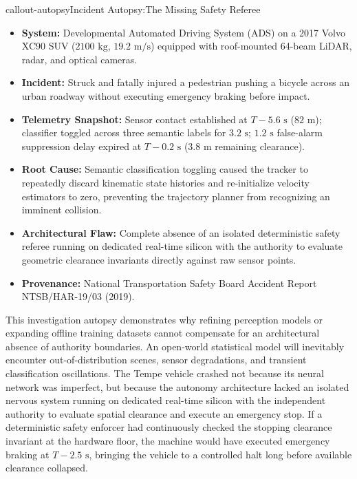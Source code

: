 \documentclass[
  10pt,
  letterpaper,
  twoside,
  openright,
  numbers=noenddot,
  headings=standardclasses
]{scrbook}
\begin{document}
\protect{}\label{callout-autopsyux2a-1.5}
\begin{fbxSimple}{callout-autopsy}{Incident Autopsy:}{The Missing Safety Referee}
\label{callout-autopsy*-1.5}

\begin{itemize}
\tightlist
\item
  \textbf{System:} Developmental Automated Driving System (ADS) on a
  2017 Volvo XC90 SUV (\(2100\text{ kg}\), \(19.2\text{ m/s}\)) equipped
  with roof-mounted 64-beam LiDAR, radar, and optical cameras.
\item
  \textbf{Incident:} Struck and fatally injured a pedestrian pushing a
  bicycle across an urban roadway without executing emergency braking
  before impact.
\item
  \textbf{Telemetry Snapshot:} Sensor contact established at
  \(T - 5.6\text{ s}\) (\(82\text{ m}\)); classifier toggled across
  three semantic labels for \(3.2\text{ s}\); \(1.2\text{ s}\)
  false-alarm suppression delay expired at \(T - 0.2\text{ s}\)
  (\(3.8\text{ m}\) remaining clearance).
\item
  \textbf{Root Cause:} Semantic classification toggling caused the
  tracker to repeatedly discard kinematic state histories and
  re-initialize velocity estimators to zero, preventing the trajectory
  planner from recognizing an imminent collision.
\item
  \textbf{Architectural Flaw:} Complete absence of an isolated
  deterministic safety referee running on dedicated real-time silicon
  with the authority to evaluate geometric clearance invariants directly
  against raw sensor points.
\item
  \textbf{Provenance:} National Transportation Safety Board Accident
  Report NTSB/HAR-19/03 (2019).
\end{itemize}

\end{fbxSimple}

This investigation autopsy demonstrates why refining perception models
or expanding offline training datasets cannot compensate for an
architectural absence of authority boundaries. An open-world statistical
model will inevitably encounter out-of-distribution scenes, sensor
degradations, and transient classification oscillations. The Tempe
vehicle crashed not because its neural network was imperfect, but
because the autonomy architecture lacked an isolated nervous system
running on dedicated real-time silicon with the independent authority to
evaluate spatial clearance and execute an emergency stop. If a
deterministic safety enforcer had continuously checked the stopping
clearance invariant at the hardware floor, the machine would have
executed emergency braking at \(T - 2.5\text{ s}\), bringing the vehicle
to a controlled halt long before available clearance
collapsed.
\end{document}
